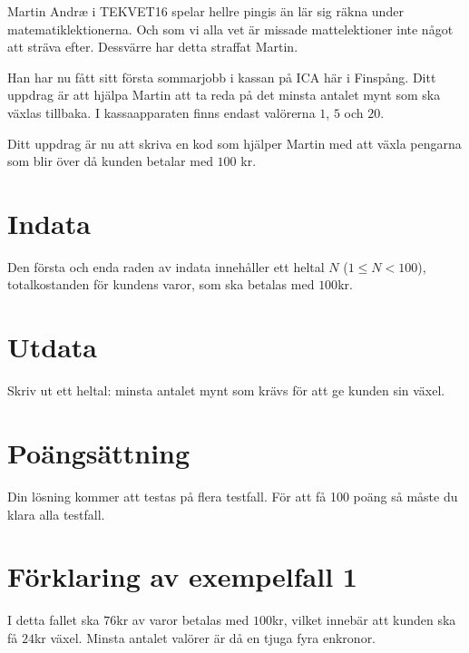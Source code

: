 Martin Andræ i TEKVET16 spelar hellre pingis än lär sig räkna under matematiklektionerna. Och som
vi alla vet är missade mattelektioner inte något att sträva efter. Dessvärre har detta straffat Martin.

Han har nu fått sitt första sommarjobb i kassan på ICA här i Finspång. Ditt uppdrag är att hjälpa Martin
att ta reda på det minsta antalet mynt som ska växlas tillbaka. I kassaapparaten finns endast valörerna
$1$, $5$ och $20$.

Ditt uppdrag är nu att skriva en kod som hjälper Martin med att växla pengarna som blir över då kunden betalar med $100$
kr.

\section*{Indata}
Den första och enda raden av indata innehåller ett heltal $N$ ($1 \leq N < 100$), totalkostanden
för kundens varor, som ska betalas med $100$kr.

\section*{Utdata}
Skriv ut ett heltal: minsta antalet mynt som krävs för att ge kunden sin växel.


\section*{Poängsättning}
Din lösning kommer att testas på flera testfall. För att få 100 poäng så måste du klara alla testfall.


\section*{Förklaring av exempelfall 1}
I detta fallet ska $76$kr av varor betalas med $100$kr, vilket innebär att kunden ska få $24$kr växel.
Minsta antalet valörer är då en tjuga fyra enkronor.
